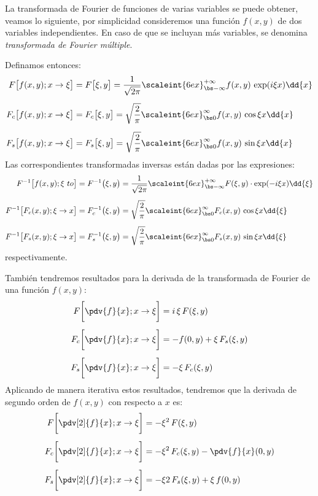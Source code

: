 La transformada de Fourier de funciones de varias variables se puede obtener, veamos lo siguiente, por simplicidad consideremos una función $f(x, y)$ de dos variables independientes. En caso de que se incluyan más variables, se denomina \emph{transformada de Fourier múltiple}.
\par
Definamos entonces:
\begin{align*}
F \big[ f(x, y); x \to \xi \big] &= F \big[ \xi, y \big] = \dfrac{1}{\sqrt{2 \pi}} \scaleint{6ex}_{\bs -\infty}^{+\infty} f(x, y) \, \exp(i \xi x) \dd{x} \\[0.5em]
F_{c} \big[ f(x, y); x \to \xi \big] &= F_{c} \big[ \xi, y \big] = \sqrt{\dfrac{2}{\pi}} \scaleint{6ex}_{\bs 0}^{\infty} f(x, y) \, \cos \xi x \dd{x} \\[0.5em]
F_{s} \big[ f(x, y); x \to \xi \big] &= F_{s} \big[ \xi, y \big] = \sqrt{\dfrac{2}{\pi}} \scaleint{6ex}_{\bs 0}^{\infty} f(x, y) \, \sin \xi x \dd{x}
\end{align*}
Las correspondientes transformadas inversas están dadas por las expresiones:
\begin{align*}
F^{-1} \big[ f(x, y); \xi \ to \big] &= F^{-1} \big( \xi, y \big) = \dfrac{1}{\sqrt{2 \pi}} \scaleint{6ex}_{\bs -\infty}^{+\infty} F(\xi, y) \cdot \exp(-i \xi x) \dd{\xi} \\[0.5em]
F^{-1} \big[ F_{c}(x, y); \xi \to x \big] &= F_{c}^{-1} \big( \xi, y \big) = \sqrt{\dfrac{2}{\pi}} \scaleint{6ex}_{\bs 0}^{\infty} F_{c} (x, y) \, \cos \xi x \dd{\xi} \\[0.5em]
F^{-1} \big[ F_{s} (x, y); \xi \to x \big] &= F_{s}^{-1} \big( \xi, y \big) = \sqrt{\dfrac{2}{\pi}} \scaleint{6ex}_{\bs 0}^{\infty} F_{s} (x, y) \, \sin \xi x \dd{\xi}
\end{align*}
respectivamente.
\par
También tendremos resultados para la derivada de la transformada de Fourier de una función $f(x, y)$:
\begin{align*}
F \bigg[ \pdv{f}{x}; x \to \xi \bigg] &= i \, \xi \, F (\xi, y) \\[0.5em]
F_{c} \bigg[ \pdv{f}{x}; x \to \xi \bigg] &= - f(0, y) +  \xi \, F_{s} (\xi, y) \\[0.5em]
F_{s} \bigg[ \pdv{f}{x}; x \to \xi \bigg] &= - \xi \, F_{c} (\xi, y)
\end{align*}
Aplicando de manera iterativa estos resultados, tendremos que la derivada de segundo orden de $f(x, y)$ con respecto a $x$ es:
\begin{align*}
F \bigg[ \pdv[2]{f}{x}; x \to \xi \bigg] &= - \xi^{2} \, F (\xi, y) \\[0.5em]
F_{c} \bigg[ \pdv[2]{f}{x}; x \to \xi \bigg] &= - \xi^{2} \, F_{c} (\xi, y) - \pdv{f}{x} (0, y) \\[0.5em]
F_{s} \bigg[ \pdv[2]{f}{x}; x \to \xi \bigg] &= - \xi{2} \, F_{s} (\xi, y) + \xi \, f(0, y)
\end{align*}

